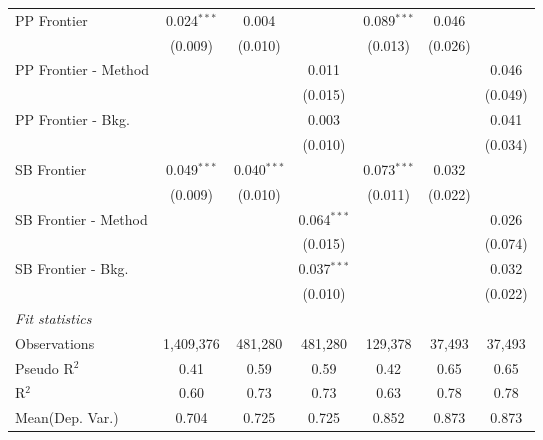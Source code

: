 \begin{tabular}{lcccccc}
   PP Frontier          & 0.024$^{***}$ & 0.004         &               & 0.089$^{***}$ & 0.046         &   \\   
                        & (0.009)       & (0.010)       &               & (0.013)       & (0.026)       &   \\   
   PP Frontier - Method &               &               & 0.011         &               &               & 0.046\\   
                        &               &               & (0.015)       &               &               & (0.049)\\   
   PP Frontier - Bkg.   &               &               & 0.003         &               &               & 0.041\\   
                        &               &               & (0.010)       &               &               & (0.034)\\   
   SB Frontier          & 0.049$^{***}$ & 0.040$^{***}$ &               & 0.073$^{***}$ & 0.032         &   \\   
                        & (0.009)       & (0.010)       &               & (0.011)       & (0.022)       &   \\   
   SB Frontier - Method &               &               & 0.064$^{***}$ &               &               & 0.026\\   
                        &               &               & (0.015)       &               &               & (0.074)\\   
   SB Frontier - Bkg.   &               &               & 0.037$^{***}$ &               &               & 0.032\\   
                        &               &               & (0.010)       &               &               & (0.022)\\   
   \midrule
   \emph{Fit statistics}\\
   Observations         & 1,409,376     & 481,280       & 481,280       & 129,378       & 37,493        & 37,493\\  
   Pseudo R$^2$         & 0.41          & 0.59          & 0.59          & 0.42          & 0.65          & 0.65\\  
   R$^2$                & 0.60          & 0.73          & 0.73          & 0.63          & 0.78          & 0.78\\  
Mean(Dep. Var.) & 0.704 & 0.725 & 0.725 & 0.852 & 0.873 & 0.873 \\
   

\end{tabular}
